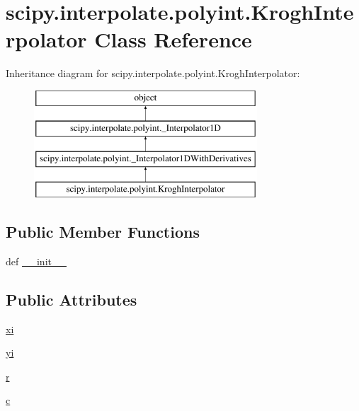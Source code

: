 \hypertarget{classscipy_1_1interpolate_1_1polyint_1_1KroghInterpolator}{}\section{scipy.\+interpolate.\+polyint.\+Krogh\+Interpolator Class Reference}
\label{classscipy_1_1interpolate_1_1polyint_1_1KroghInterpolator}
Inheritance diagram for scipy.\+interpolate.\+polyint.\+Krogh\+Interpolator\+:\begin{figure}[H]
\begin{center}
\leavevmode
\includegraphics[height=4.000000cm]{classscipy_1_1interpolate_1_1polyint_1_1KroghInterpolator}
\end{center}
\end{figure}
\subsection*{Public Member Functions}
\begin{DoxyCompactItemize}
\item 
def \hyperlink{classscipy_1_1interpolate_1_1polyint_1_1KroghInterpolator_aba121a8d9f0e3d3356d20ab29e2ff644}{\+\_\+\+\_\+init\+\_\+\+\_\+}
\end{DoxyCompactItemize}
\subsection*{Public Attributes}
\begin{DoxyCompactItemize}
\item 
\hyperlink{classscipy_1_1interpolate_1_1polyint_1_1KroghInterpolator_acc8643d0c76444c98db806722db1d144}{xi}
\item 
\hyperlink{classscipy_1_1interpolate_1_1polyint_1_1KroghInterpolator_a3666892eff7b45b8bbd623bc7760457f}{yi}
\item 
\hyperlink{classscipy_1_1interpolate_1_1polyint_1_1KroghInterpolator_a1f30434de264f2c14bb054764e6efa35}{r}
\item 
\hyperlink{classscipy_1_1interpolate_1_1polyint_1_1KroghInterpolator_ae81db9c3910f0e9fefd72f259e1c07ea}{c}
\end{DoxyCompactItemize}


